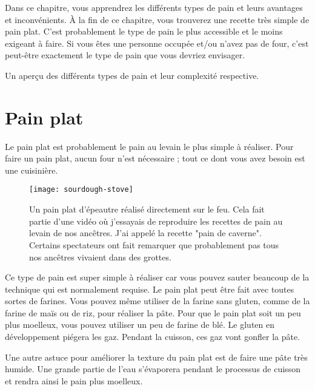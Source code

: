 \begin{quoting}
Dans ce chapitre, vous apprendrez les différents types de pain et leurs
avantages et inconvénients. À la fin de ce chapitre, vous trouverez une recette
très simple de pain plat. C'est probablement le type de pain le plus accessible et le moins
exigeant à faire. Si vous êtes une personne occupée et/ou n'avez pas de
four, c'est peut-être exactement le type de pain que vous devriez envisager.
\end{quoting}

\begin{table}[!htb]
    \begin{center}
        
        \caption[Différents types de pain]{Un aperçu des différents types de pain
            et leur complexité respective.}%
        \label{tab:bread-types-comparison}
    \end{center}
\end{table}

\section{Pain plat}

Le pain plat est probablement le pain au levain le plus simple à réaliser.
Pour faire un pain plat, aucun four n'est nécessaire ; tout ce dont vous avez besoin est une cuisinière.

\begin{figure}[!htb]
  \texttt{[image: sourdough-stove]}
  \caption[Einkorn cuit sur feu ouvert]{Un pain plat d'épeautre réalisé directement sur
      le feu. Cela fait partie d'une vidéo où j'essayais de reproduire les recettes de pain au levain
      de nos ancêtres. J'ai appelé la recette "pain de caverne". Certains
      spectateurs ont fait remarquer que probablement pas tous nos ancêtres vivaient dans des grottes.}
\end{figure}

Ce type de pain est super simple à réaliser car vous pouvez sauter
beaucoup de la technique qui est normalement requise. Le pain plat
peut être fait avec toutes sortes de farines. Vous pouvez même utiliser
de la farine sans gluten, comme de la farine de maïs ou de riz, pour réaliser la
pâte. Pour que le pain plat soit un peu plus moelleux, vous
pouvez utiliser un peu de farine de blé. Le gluten en développement
piégera les gaz. Pendant la cuisson, ces gaz vont gonfler la pâte.

Une autre astuce pour améliorer la texture du pain plat est de
faire une pâte très humide. Une grande partie de l'eau s'évaporera
pendant le processus de cuisson et rendra ainsi le pain plus moelleux.

